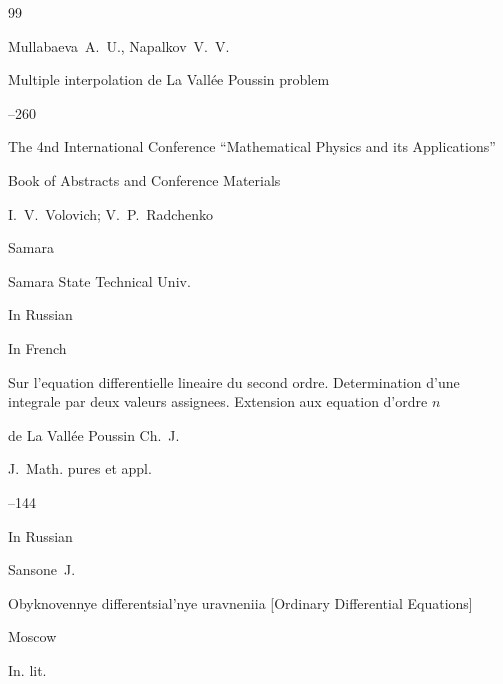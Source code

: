 \EngRef









\begin{thebibliography}{99}




\by Mullabaeva~A.~U., Napalkov~V.~V. 

\paper Multiple interpolation  de La Vall\'ee Poussin problem

--260

\inbook  The 4nd International Conference ``Mathematical Physics and its Applications''

\bookinfo Book of Abstracts and Conference Materials

\eds I.~V.~Volovich; V.~P.~Radchenko

\publaddr Samara

\publ Samara State Technical Univ.


\lang In Russian




\lang In French

\paper Sur l'equation differentielle lineaire du second ordre. Deter\-mi\-na\-tion d’une integrale par deux valeurs assignees. Extension aux equation d'ordre $n$

\by de La Vall\'ee Poussin Ch.~J.

\jour J.~Math. pures et appl.




--144





\lang In Russian

\by Sansone~J.

\book Obyknovennye differentsial'nye uravneniia \rm [Ordinary Differential Equations]

\publaddr Moscow

\publ In. lit.






\end{thebibliography}
